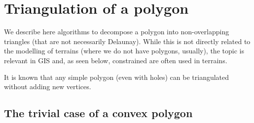 \section{Triangulation of a polygon}

We describe here algorithms to decompose a polygon into non-overlapping triangles (that are not necessarily Delaunay).
While this is not directly related to the modelling of terrains (where we do not have polygons, usually), the topic is relevant in GIS and, as seen below, constrained are often used in terrains.

It is known that any simple polygon (even with holes) can be triangulated without adding new vertices.

%
\subsection{The trivial case of a convex polygon}

